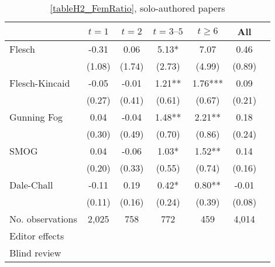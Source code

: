 \begin{table}
    \footnotesize
    \centering
    \begin{threeparttable}
        \caption{\autoref{tableH2_FemRatio}, solo-authored papers}
        \label{tableH2_FemSolo}
        \begin{tabular}{p{3cm}S@{}S@{}S@{}S@{}S@{}S@{}}
            \toprule
            &{\(t=1\)}&{\(t=2\)}&{\(t=3\text{--}5\)}&{\(t\ge6\)}&{All}\\
            \midrule
            Flesch                        &       -0.31   &        0.06   &        5.13*  &        7.07   &        0.46   \\
                                          &      (1.08)   &      (1.74)   &      (2.73)   &      (4.99)   &      (0.89)   \\
            Flesch-Kincaid                &       -0.05   &       -0.01   &        1.21** &        1.76***&        0.09   \\
                                          &      (0.27)   &      (0.41)   &      (0.61)   &      (0.67)   &      (0.21)   \\
            Gunning Fog                   &        0.04   &       -0.04   &        1.48** &        2.21** &        0.18   \\
                                          &      (0.30)   &      (0.49)   &      (0.70)   &      (0.86)   &      (0.24)   \\
            SMOG                          &        0.04   &       -0.06   &        1.03*  &        1.52** &        0.14   \\
                                          &      (0.20)   &      (0.33)   &      (0.55)   &      (0.74)   &      (0.16)   \\
            Dale-Chall                    &       -0.11   &        0.19   &        0.42*  &        0.80** &       -0.01   \\
                                          &      (0.11)   &      (0.16)   &      (0.24)   &      (0.39)   &      (0.08)   \\
            \midrule
            No. observations              &       2,025   &         758   &         772   &         459   &       4,014   \\
            \midrule
            Editor effects       &           {}   &           {}   &           {}   &           {}   &           {}   \\
            Blind review                  &           {}   &           {}   &           {}   &           {}   &           {}   \\

\end{tabular}
\end{threeparttable}
\end{table}
